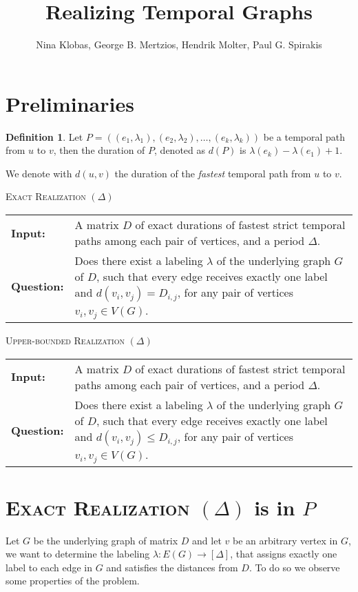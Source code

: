 \documentclass[11pt,a4paper]{article}
\title{Realizing Temporal Graphs}
\author{Nina Klobas, George B. Mertzios, Hendrik Molter, Paul G. Spirakis}
\makeatletter
\theoremstyle{remark}
\theoremstyle{definition}
\newtheorem{definition}[theorem]{Definition}
\newcommand{\problemdef}[3]{
	\begin{center}
		\begin{minipage}{0.95\textwidth}
			\noindent
			#1
			\vspace{5pt}\\
			\setlength{\tabcolsep}{3pt}
			\begin{tabularx}{\textwidth}{@{}lX@{}}
				\textbf{Input:}& #2 \\
				\textbf{Question:}& #3
			\end{tabularx}
		\end{minipage}
	\end{center}
}
\makeatother
\begin{document}
	\maketitle

\section{Preliminaries}

\begin{definition}
	Let $P = ((e_1, \lambda_1), (e_2,\lambda_2), \dots , (e_k, \lambda_k))$ be a temporal path from $u$ to $v$, then the duration of $P$, denoted as $d(P)$ is $\lambda(e_k) - \lambda(e_1) + 1$.
\end{definition}

We denote with $d(u,v)$ the duration of the \emph{fastest} temporal path from $u$ to $v$.
	
	
\problemdef{\textsc{Exact Realization $(\Delta)$}}
{A matrix $D$ of exact durations of fastest strict temporal paths among each pair of vertices, and a period $\Delta$.}
{Does there exist a labeling $\lambda$ of the underlying graph $G$ of $D$, such that every edge receives exactly one label and $d(v_i,v_j) = D_{i,j}$, for any pair of vertices $v_i, v_j \in V(G)$.}

\problemdef{\textsc{Upper-bounded Realization $(\Delta)$}}
{A matrix $D$ of exact durations of fastest strict temporal paths among each pair of vertices, and a period $\Delta$.}
{Does there exist a labeling $\lambda$ of the underlying graph $G$ of $D$, such that every edge receives exactly one label and $d(v_i,v_j) \leq D_{i,j}$, for any pair of vertices $v_i, v_j \in V(G)$.}



\section{
\texorpdfstring{\textsc{Exact Realization $(\Delta)$} is in $P$}
{Exact Realization (Delta) is in P}
}

	Let $G$ be the underlying graph of matrix $D$ and let $v$ be an arbitrary vertex in $G$, we want to determine the labeling $\lambda: E(G) \rightarrow [\Delta]$, that assigns exactly one label to each edge in $G$ and satisfies the distances from $D$.
	To do so we observe some properties of the problem.
	
\end{document}
